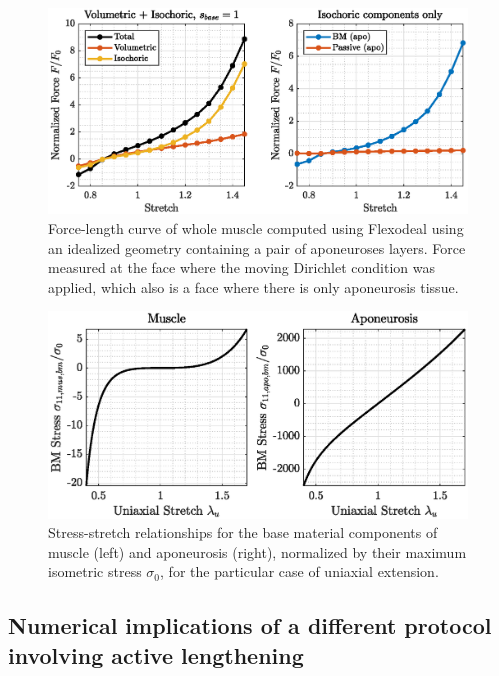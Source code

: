\documentclass{sfuthesis}
\numberwithin{equation}{section}
\numberwithin{figure}{chapter}
\numberwithin{table}{chapter}
\theoremstyle{definition}
\begin{document}
\begin{figure}
    \centering
    \includegraphics[width=0.99\textwidth]{fl_curve_flexodeal_full_apo_thin.eps}
    \caption{Force-length curve of whole muscle computed using Flexodeal using an idealized geometry containing a pair of aponeuroses layers. Force measured at the face where the moving Dirichlet condition was applied, which also is a face where there is only aponeurosis tissue.\label{fig:fl-curve-apo}}
\end{figure}

\begin{figure}
    \centering
    \includegraphics[width=0.99\textwidth]{uniaxial_stress_bm.eps}
    \caption{Stress-stretch relationships for the base material components of muscle (left) and aponeurosis (right), normalized by their maximum isometric stress $\sigma_0$, for the particular case of uniaxial extension.
    \label{fig:uniaxial_extension_bm}}
\end{figure}


\subsection{Numerical implications of a different protocol involving active lengthening}
\end{document}
